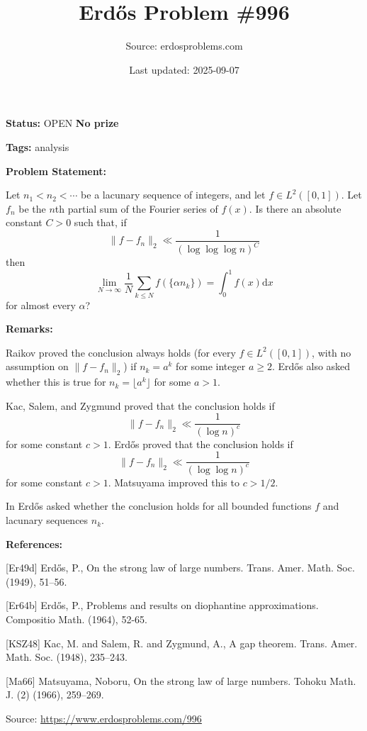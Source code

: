 \documentclass{article}
\title{Erd\H{o}s Problem \#996}
\date{Last updated: 2025-09-07}
\author{Source: erdosproblems.com}
\begin{document}
\maketitle

\noindent\textbf{Status:} OPEN \quad \textbf{No prize}

\noindent\textbf{Tags:} analysis

\medskip
\noindent\textbf{Problem Statement:}

Let $n_1<n_2<\cdots$ be a lacunary sequence of integers, and let $f\in L^2([0,1])$. Let $f_n$ be the $n$th partial sum of the Fourier series of $f(x)$. Is there an absolute constant $C>0$ such that, if\[\| f-f_n\|_2 \ll \frac{1}{(\log\log\log n)^{C}}\]then\[\lim_{N\to\infty}\frac{1}{N}\sum_{k\leq N}f(\{\alpha n_k\})=\int_0^1 f(x)\mathrm{d}x\]for almost every $\alpha$?

\bigskip
\noindent\textbf{Remarks:}

Raikov proved the conclusion always holds (for every $f\in L^2([0,1])$, with no assumption on $\| f-f_n\|_2$) if $n_k=a^k$ for some integer $a\geq 2$. Erd\H{o}s \cite{Er64b} also asked whether this is true for $n_k=\lfloor a^k\rfloor$ for some $a>1$.

Kac, Salem, and Zygmund \cite{KSZ48} proved that the conclusion holds if\[\| f-f_n\|_2 \ll \frac{1}{(\log n)^{c}}\]for some constant $c>1$. Erd\H{o}s \cite{Er49d} proved that the conclusion holds if\[\| f-f_n\|_2 \ll \frac{1}{(\log\log n)^{c}}\]for some constant $c>1$. Matsuyama \cite{Ma66} improved this to $c>1/2$.

In \cite{Er64b} Erd\H{o}s asked whether the conclusion holds for all bounded functions $f$ and lacunary sequences $n_k$.

\bigskip
\noindent\textbf{References:}

[Er49d] Erd\H{o}s, P., On the strong law of large numbers. Trans. Amer. Math. Soc. (1949), 51--56.
 
 [Er64b] Erd\H{o}s, P., Problems and results on diophantine approximations. Compositio Math. (1964), 52-65.
 
 [KSZ48] Kac, M. and Salem, R. and Zygmund, A., A gap theorem. Trans. Amer. Math. Soc. (1948), 235--243.
 
 [Ma66] Matsuyama, Noboru, On the strong law of large numbers. Tohoku Math. J. (2) (1966), 259--269.

\bigskip
\noindent\small{Source: \url{https://www.erdosproblems.com/996}}
\end{document}
